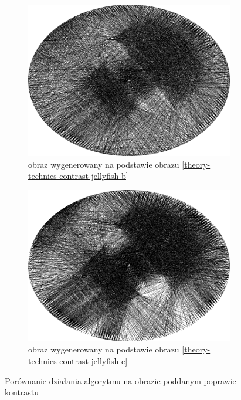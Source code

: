         \begin{figure}[H] 
        \centering
        \begin{subfigure}{0.49\textwidth}
            \centering
            \includegraphics[width = \textwidth]{img/2-theory/10-jellyfish_b_ellipse_2000_threaded.png}
            \caption{obraz wygenerowany na podstawie obrazu \ref{theory-technics-contrast-jellyfish-b}}
            \label{theory-technics-contrast-thread-jellyfish-a}
        \end{subfigure}
        \begin{subfigure}{0.49\textwidth}
            \centering
            \includegraphics[width = \textwidth]{img/2-theory/20-jellyfish_b_ellipse_2000_threaded.png}
            \caption{obraz wygenerowany na podstawie obrazu \ref{theory-technics-contrast-jellyfish-c}}
            \label{theory-technics-contrast-thread-jellyfish-b}
        \end{subfigure}
        \caption{Porównanie działania algorytmu na obrazie poddanym poprawie kontrastu}
        \label{theory-technics-contrast-thread-jellyfish}
        \end{figure}
        
